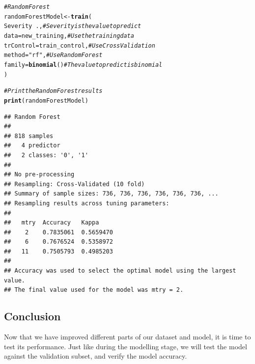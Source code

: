 \documentclass[a4paper,12pt]{article}\usepackage[]{graphicx}\usepackage[]{color}
\makeatletter
\newcommand{\hlstr}[1]{\textcolor[rgb]{0.192,0.494,0.8}{#1}}%
\newcommand{\hlcom}[1]{\textcolor[rgb]{0.678,0.584,0.686}{\textit{#1}}}%
\newcommand{\hlopt}[1]{\textcolor[rgb]{0,0,0}{#1}}%
\newcommand{\hlstd}[1]{\textcolor[rgb]{0.345,0.345,0.345}{#1}}%
\newcommand{\hlkwb}[1]{\textcolor[rgb]{0.69,0.353,0.396}{#1}}%
\newcommand{\hlkwc}[1]{\textcolor[rgb]{0.333,0.667,0.333}{#1}}%
\newcommand{\hlkwd}[1]{\textcolor[rgb]{0.737,0.353,0.396}{\textbf{#1}}}%
\newenvironment{kframe}{%
 \def\at@end@of@kframe{}%
 \ifinner\ifhmode%
  \def\at@end@of@kframe{\end{minipage}}%
  \begin{minipage}{\columnwidth}%
 \fi\fi%
 \def\FrameCommand##1{\hskip\@totalleftmargin \hskip-\fboxsep
 \colorbox{shadecolor}{##1}\hskip-\fboxsep
     \hskip-\linewidth \hskip-\@totalleftmargin \hskip\columnwidth}%
 \MakeFramed {\advance\hsize-\width
   \@totalleftmargin\z@ \linewidth\hsize
   \@setminipage}}%
 {\par\unskip\endMakeFramed%
 \at@end@of@kframe}
\newenvironment{knitrout}{}{} %
\makeatother
\begin{document}
\begin{knitrout}
\color{fgcolor}\begin{kframe}
\begin{alltt}
\hlcom{# Random Forest}
\hlstd{randomForestModel}\hlkwb{<-} \hlkwd{train}\hlstd{(}
  \hlstd{Severity}\hlopt{~}\hlstd{.,}                \hlcom{# Severity is the value to predict}
  \hlkwc{data}\hlstd{=new_training,}         \hlcom{# Use the training data}
  \hlkwc{trControl}\hlstd{=train_control,}   \hlcom{# Use Cross Validation}
  \hlkwc{method}\hlstd{=}\hlstr{"rf"}\hlstd{,}               \hlcom{# Use Random Forest}
  \hlkwc{family}\hlstd{=}\hlkwd{binomial}\hlstd{()}          \hlcom{# The value to predict is binomial}
\hlstd{)}

\hlcom{# Print the Random Forest results}
\hlkwd{print}\hlstd{(randomForestModel)}
\end{alltt}
\begin{verbatim}
## Random Forest 
## 
## 818 samples
##   4 predictor
##   2 classes: '0', '1' 
## 
## No pre-processing
## Resampling: Cross-Validated (10 fold) 
## Summary of sample sizes: 736, 736, 736, 736, 736, 736, ... 
## Resampling results across tuning parameters:
## 
##   mtry  Accuracy   Kappa    
##    2    0.7835061  0.5659470
##    6    0.7676524  0.5358972
##   11    0.7505793  0.4985203
## 
## Accuracy was used to select the optimal model using the largest value.
## The final value used for the model was mtry = 2.
\end{verbatim}
\end{kframe}
\end{knitrout}

\clearpage

\subsection{Conclusion}\label{improvement_conclusion}
Now that we have improved different parts of our dataset and model, it is time to test its performance. Just like during the modelling stage, we will test the model against the validation subset, and verify the model accuracy.
\end{document}
